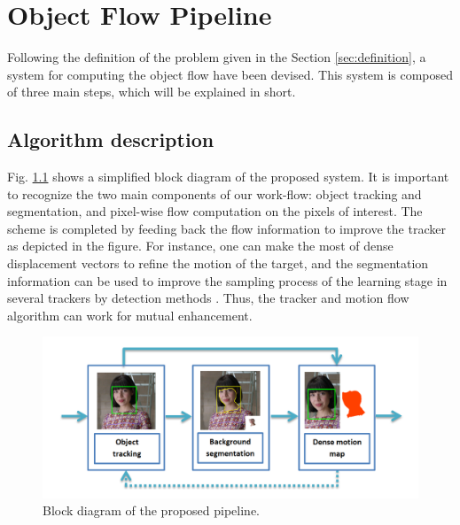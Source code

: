 
\chapter{Object Flow Pipeline} \label{chap:core}
Following the definition of the problem given in the Section \ref{sec:definition}, a 
 system for computing the object flow have been devised. 
 This system is composed of three  main steps, which will be explained in short.  
 
\section{Algorithm description}
\label{sec:desc}

Fig. \ref{figurelabel_sys} shows a simplified block diagram of the proposed system. It is important to recognize the two main 
components of our work-flow: object tracking and segmentation, and pixel-wise flow computation on the pixels of interest.  The scheme is completed by feeding back the flow 
information to improve the tracker as depicted in the figure. For instance, one can make the most of dense displacement vectors to refine the motion of the target, and 
the segmentation information can be used to improve the sampling process of the learning stage in several trackers by detection methods \cite{c22}. Thus, 
the tracker and motion flow algorithm can work for mutual enhancement.

   \begin{figure}[thpb]
      \centering
      \includegraphics[width=1.00\textwidth]{../images/system.png}
      \caption{Block diagram of the proposed pipeline.}
      \label{figurelabel_sys}
   \end{figure}

